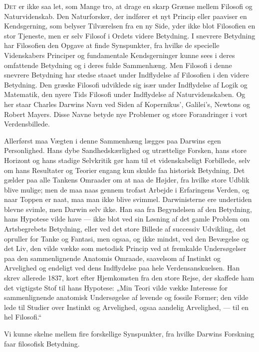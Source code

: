 \documentclass[12pt,a4paper,openany]{book}
\newcommand{\opage}[1]{\marginnote{\footnotesize\textit{[#1]}}}
\begin{document}
D\textsc{et} er ikke saa let, som Mange tro, at drage en skarp
Grænse mellem Filosofi og Naturvidenskab. Den Naturforsker,
der indfører et nyt Princip eller paaviser en Kendsgerning,
som belyser Tilværelsen fra en ny Side, yder ikke
blot Filosofien en stor Tjeneste, men er selv Filosof i Ordets
videre Betydning. I snevrere Betydning har Filosofien den
Opgave at finde Synspunkter, fra hvilke de specielle Videnskabers
Principer og fundamentale Kendsgerninger kunne sees
i deres omfattende Betydning og i deres fulde Sammenhæng.
Men Filosofi i denne snevrere Betydning har stedse staaet
under Indflydelse af Filosofien i den videre Betydning. Den
græske Filosofi udviklede sig især under Indflydelse af Logik
og Matematik, den nyere Tids Filosofi under Indflydelse af
Naturvidenskaben. Og her staar Charles Darwins Navn ved
Siden af Kopernikus’, Galilei’s, Newtons og Robert Mayers.
Disse Navne betyde nye Problemer og store Forandringer i
vort Verdensbillede.

Allerførst maa Vægten i denne Sammenhæng lægges paa
Darwins egen Personlighed. Hans dybe Sandhedskærlighed og
utrættelige Forsken, hans store Horizont og hans stadige Selvkritik
gør ham til et videnskabeligt Forbillede, selv om hans
Resultater og Teorier engang kun skulde faa historisk Betydning.
\setcounter{footnote}{0}%
\opage{203}Det gælder paa alle Tankens Omraader om at naa de Højder,
fra hvilke store Udblik blive mulige; men de maa naas gennem
trofast Arbejde i Erfaringens Verden, og naar Toppen er naat,
maa man ikke blive svimmel. Darwinisterne ere undertiden
blevne svimle, men Darwin selv ikke. Han saa fra Begyndelsen
af den Betydning, hans Hypotese vilde have --- ikke blot ved
sin Løsning af det gamle Problem om Artsbegrebets Betydning,
eller ved det store Billede af successiv Udvikling, det opruller
for Tanke og Fantasi, men ogsaa, og ikke mindst, ved den Bevægelse
og det Liv, den vilde vække som metodisk Princip
ved at fremkalde Undersøgelser paa den sammenlignende Anatomis
Omraade, saavelsom af Instinkt og Arvelighed og endeligt
ved dens Indflydelse paa hele Verdensanskuelsen. Han skrev
allerede 1837, kort efter Hjemkomsten fra den store Rejse, der
skaffede ham det vigtigste Stof til hans Hypotese: „Min Teori
vilde vække Interesse for sammenlignende anatomisk Undersøgelse
af levende og fossile Former; den vilde lede til Studier over
Instinkt og Arvelighed, ogsaa aandelig Arvelighed, --- til en hel
Filosofi.“

Vi kunne skelne mellem fire forskellige Synspunkter, fra
hvilke Darwins Forskning faar filosofisk Betydning.
\end{document}
